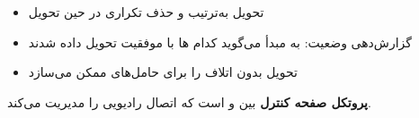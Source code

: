 \begin{enumerate}
  \begin{itemize}
  \tightlist
  \item
    تحویل به‌ترتیب و حذف تکراری در حین تحویل
  \item
    گزارش‌دهی وضعیت: به  مبدأ می‌گوید کدام ها با موفقیت تحویل داده شدند
  \item
    تحویل بدون اتلاف را برای حامل‌های  ممکن می‌سازد
  \end{itemize}
\end{enumerate}





 \textbf{پروتکل صفحه کنترل} بین  و  است که اتصال رادیویی را مدیریت می‌کند.


